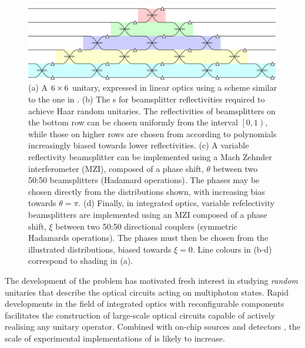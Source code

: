 \begin{figure}[t]
  \includegraphics{figures/example}
  \caption[A $6 \by 6$ unitary, expressed in linear optics]
    {(a) A \(6 \by 6\) unitary, expressed in linear optics using a scheme
    similar to the one in \cite{reck}. (b) The \pdf{}s for
    beamsplitter reflectivities required to achieve Haar random unitaries.
    The reflectivities of beamsplitters on the
    bottom row can be chosen uniformly from the interval \(\left[ 0,1 \right)\),
    while those on higher rows are chosen from according to polynomials
    increasingly biased towards lower reflectivities. (c) A variable
    reflectivity beamsplitter can be implemented using a Mach Zehnder
    interferometer (MZI), composed of a phase shift, \(\theta\) between two
    50:50 beamsplitters (Hadamard operations). The phases may be chosen directly
    from the distributions shown, with increasing bias towards \(\theta=\pi\).
    (d) Finally, in integrated optics, variable refelectivity beamsplitters are
    implemented using an MZI composed of a phase shift, \(\xi\) between two
    50:50 directional couplers (symmetric Hadamards operations). The phases must
    then be chosen from the illustrated distributions, biased towards \(\xi=0\).
    Line colours in (b-d) correspond to shading in (a).}
  \label{fig:example}
\end{figure}

The development of the \bosonsampling{} problem \cite{bosonsampling} has
motivated fresh interest in studying \emph{random} unitaries that describe the
optical circuits acting on multiphoton states. Rapid developments in the field
of integrated optics with reconfigurable components facilitates the construction
of large-scale optical circuits capable of actively realising any unitary
operator. Combined with on-chip sources \cite{si-nphoton-8-104}
and detectors \cite{re-srep-3, pe-ncomm-3-1325}, the scale of experimental
implementations of \bosonsampling{} \cite{bs-rome, bs-brisbane,
bs-oxford, bs-vienna} is likely to increase.

